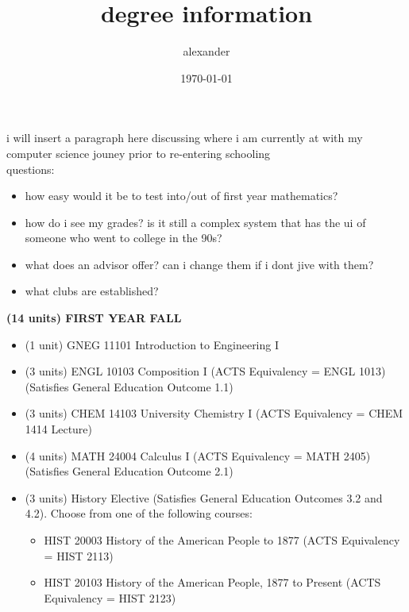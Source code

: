 \documentclass{article}
\title{degree information}
\date{\today}
\author{alexander}
\begin{document}
\maketitle

i will insert a paragraph here discussing where i am currently at with my computer science jouney prior to re-entering schooling\\

questions:
	\begin{itemize}
		\item how easy would it be to test into/out of first year mathematics?
		\item how do i see my grades? is it still a complex system that has the ui of someone who went to college in the 90s? 
		\item what does an advisor offer? can i change them if i dont jive with them?
		\item what clubs are established?
	\end{itemize}

\textbf{(14 units) FIRST YEAR FALL}
	\begin{itemize}
		\item (1 unit) GNEG 11101 Introduction to Engineering I
		\item (3 units) ENGL 10103 Composition I (ACTS Equivalency = ENGL 1013) (Satisfies General Education Outcome 1.1)
		\item (3 units) CHEM 14103 University Chemistry I (ACTS Equivalency = CHEM 1414 Lecture)
		\item (4 units) MATH 24004 Calculus I (ACTS Equivalency = MATH 2405) (Satisfies General Education Outcome 2.1)
		\item (3 units) History Elective (Satisfies General Education Outcomes 3.2 and 4.2). Choose from one of the following courses:
			\begin{itemize}
				\item HIST 20003 History of the American People to 1877 (ACTS Equivalency = HIST 2113)
				\item HIST 20103 History of the American People, 1877 to Present (ACTS Equivalency = HIST 2123)
			\end{itemize}
	\end{itemize}
\end{document}
